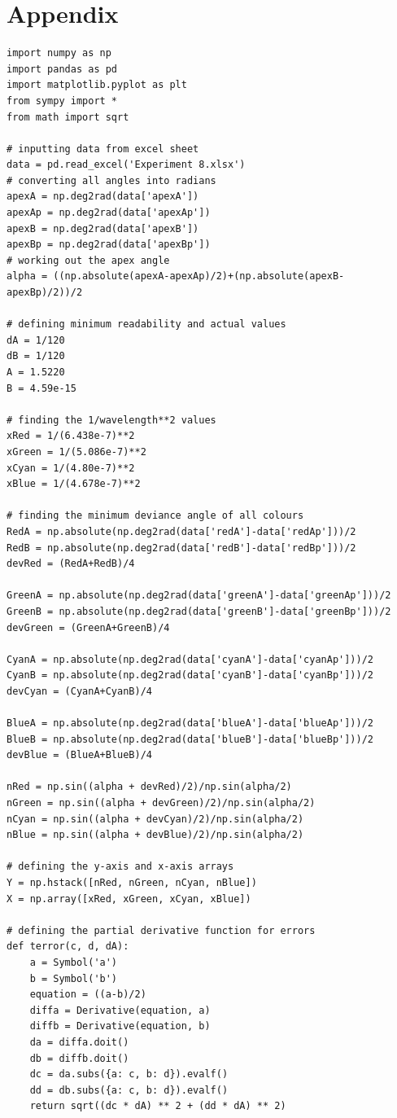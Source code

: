 \documentclass[12pt, a4paper]{article}
\begin{document}
\section*{Appendix}
\begin{verbatim}
import numpy as np
import pandas as pd
import matplotlib.pyplot as plt
from sympy import *
from math import sqrt

# inputting data from excel sheet
data = pd.read_excel('Experiment 8.xlsx')
# converting all angles into radians
apexA = np.deg2rad(data['apexA'])
apexAp = np.deg2rad(data['apexAp'])
apexB = np.deg2rad(data['apexB'])
apexBp = np.deg2rad(data['apexBp'])
# working out the apex angle
alpha = ((np.absolute(apexA-apexAp)/2)+(np.absolute(apexB-apexBp)/2))/2

# defining minimum readability and actual values
dA = 1/120
dB = 1/120
A = 1.5220
B = 4.59e-15

# finding the 1/wavelength**2 values
xRed = 1/(6.438e-7)**2
xGreen = 1/(5.086e-7)**2
xCyan = 1/(4.80e-7)**2
xBlue = 1/(4.678e-7)**2

# finding the minimum deviance angle of all colours
RedA = np.absolute(np.deg2rad(data['redA']-data['redAp']))/2
RedB = np.absolute(np.deg2rad(data['redB']-data['redBp']))/2
devRed = (RedA+RedB)/4

GreenA = np.absolute(np.deg2rad(data['greenA']-data['greenAp']))/2
GreenB = np.absolute(np.deg2rad(data['greenB']-data['greenBp']))/2
devGreen = (GreenA+GreenB)/4

CyanA = np.absolute(np.deg2rad(data['cyanA']-data['cyanAp']))/2
CyanB = np.absolute(np.deg2rad(data['cyanB']-data['cyanBp']))/2
devCyan = (CyanA+CyanB)/4

BlueA = np.absolute(np.deg2rad(data['blueA']-data['blueAp']))/2
BlueB = np.absolute(np.deg2rad(data['blueB']-data['blueBp']))/2
devBlue = (BlueA+BlueB)/4

nRed = np.sin((alpha + devRed)/2)/np.sin(alpha/2)
nGreen = np.sin((alpha + devGreen)/2)/np.sin(alpha/2)
nCyan = np.sin((alpha + devCyan)/2)/np.sin(alpha/2)
nBlue = np.sin((alpha + devBlue)/2)/np.sin(alpha/2)

# defining the y-axis and x-axis arrays
Y = np.hstack([nRed, nGreen, nCyan, nBlue])
X = np.array([xRed, xGreen, xCyan, xBlue])

# defining the partial derivative function for errors
def terror(c, d, dA):
    a = Symbol('a')
    b = Symbol('b')
    equation = ((a-b)/2)
    diffa = Derivative(equation, a)
    diffb = Derivative(equation, b)
    da = diffa.doit()
    db = diffb.doit()
    dc = da.subs({a: c, b: d}).evalf()
    dd = db.subs({a: c, b: d}).evalf()
    return sqrt((dc * dA) ** 2 + (dd * dA) ** 2)


\end{verbatim}
\end{document}
